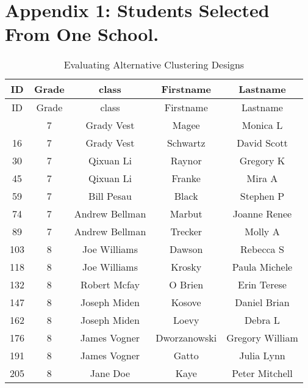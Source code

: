 \documentclass[
  12pt]{article}
\begin{document}
\newpage

\section{Appendix 1: Students Selected From One
School.}\label{appendix-1-students-selected-from-one-school.}

\begin{longtable}[]{@{}ccccc@{}}
\caption{Evaluating Alternative Clustering Designs}\tabularnewline
\toprule\noalign{}
ID & Grade & class & Firstname & Lastname \\
\midrule\noalign{}
\endfirsthead
\toprule\noalign{}
ID & Grade & class & Firstname & Lastname \\
\midrule\noalign{}
\endhead
\bottomrule\noalign{}
\endlastfoot
1 & 7 & Grady Vest & Magee & Monica L \\
16 & 7 & Grady Vest & Schwartz & David Scott \\
30 & 7 & Qixuan Li & Raynor & Gregory K \\
45 & 7 & Qixuan Li & Franke & Mira A \\
59 & 7 & Bill Pesau & Black & Stephen P \\
74 & 7 & Andrew Bellman & Marbut & Joanne Renee \\
89 & 7 & Andrew Bellman & Trecker & Molly A \\
103 & 8 & Joe Williams & Dawson & Rebecca S \\
118 & 8 & Joe Williams & Krosky & Paula Michele \\
132 & 8 & Robert Mcfay & O Brien & Erin Terese \\
147 & 8 & Joseph Miden & Kosove & Daniel Brian \\
162 & 8 & Joseph Miden & Loevy & Debra L \\
176 & 8 & James Vogner & Dworzanowski & Gregory William \\
191 & 8 & James Vogner & Gatto & Julia Lynn \\
205 & 8 & Jane Doe & Kaye & Peter Mitchell \\
\end{longtable}
\end{document}
